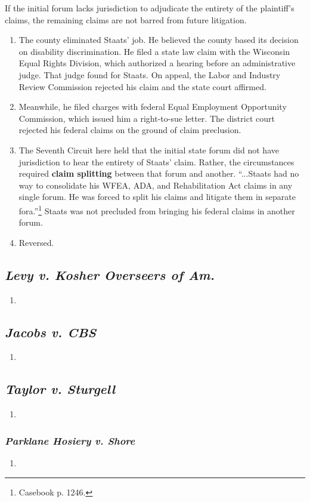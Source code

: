 If the initial forum lacks jurisdiction to adjudicate the entirety of the 
plaintiff's claims, the remaining claims are not barred from future 
litigation.

\begin{enumerate}
    \item The county eliminated Staats' job. He believed the county based its 
    decision on disability discrimination. He filed a state law claim with the 
    Wisconsin Equal Rights Division, which authorized a hearing before an 
    administrative judge. That judge found for Staats. On appeal, the Labor 
    and Industry Review Commission rejected his claim and the state court 
    affirmed.
    \item Meanwhile, he filed charges with federal Equal Employment 
    Opportunity Commission, which issued him a right-to-sue letter. The 
    district court rejected his federal claims on the ground of claim 
    preclusion.
    \item The Seventh Circuit here held that the initial state forum 
    did not have jurisdiction to hear the entirety of Staats' claim. Rather, 
    the circumstances required \textbf{claim splitting} between that forum and 
    another. ``...Staats had no way to consolidate his WFEA, ADA, and 
    Rehabilitation Act claims in any single forum. He was forced to split his 
    claims and litigate them in separate fora.''\footnote{Casebook p. 1246.} 
    Staats was not precluded from bringing his federal claims in another 
    forum.
    \item Reversed.
\end{enumerate}

\subsection{\emph{Levy v. Kosher Overseers of Am.}}

\begin{enumerate}
    \item %
\end{enumerate}

\subsection{\emph{Jacobs v. CBS}}

\begin{enumerate}
    \item %
\end{enumerate}

\subsection{\emph{Taylor v. Sturgell}}

\begin{enumerate}
    \item %
\end{enumerate}

\subsubsection{\emph{Parklane Hosiery v. Shore}}

\begin{enumerate}
    \item %
\end{enumerate}
